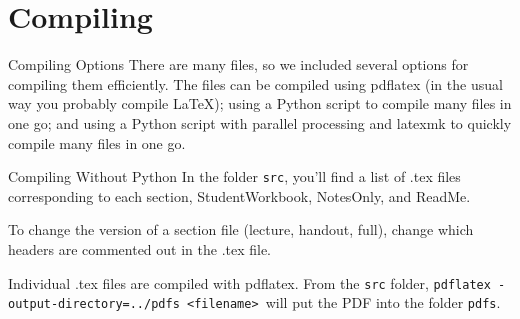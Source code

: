 \documentclass[10pt]{beamer}
\begin{document}
\section{Compiling}
\frame{\tableofcontents[currentsection]}
\begin{frame}{Compiling Options}
There are many files, so we included several options for compiling them efficiently. The files can be compiled using pdflatex (in the usual way you probably compile LaTeX); using a Python script to compile many files in one go; and using a Python script with parallel processing and latexmk to quickly compile many files in one go.
\end{frame}
\begin{frame}{Compiling Without Python}
In the folder \texttt{src}, you'll find a list of .tex files corresponding to each section, StudentWorkbook, NotesOnly, and ReadMe.
\vfill

To change the version of a section file (lecture, handout, full), change which headers are commented out in the .tex file.

\vfill

Individual .tex files are compiled with pdflatex. From the \texttt{src} folder, \texttt{pdflatex -output-directory=../pdfs  <filename> }will put the PDF into the folder \texttt{pdfs}.
\end{frame}
\end{document}
